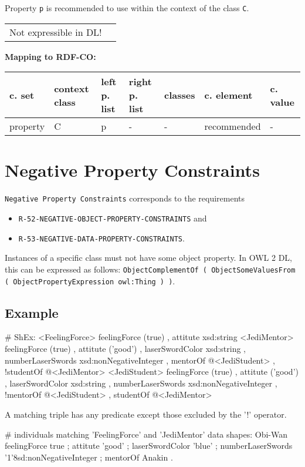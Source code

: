 \documentclass{llncs}
\newcommand{\ms}[1]{\texttt{#1}}
\newenvironment{gcotable}{
  \scriptsize
  \sffamily
  \vspace{0cm}
	\begin{center}
	\textbf{\vspace{0.4cm}Mapping to RDF-CO:} \\
  \begin{tabular}{l|l|l|l|l|l|l}
	\hline
  \textbf{c. set} & \textbf{context class} & \textbf{left p. list} & \textbf{right p. list} & \textbf{classes} & \textbf{c. element} & \textbf{c. value} \\
  \hline

}{
  \hline
  \end{tabular}
	\end{center}
}
\newenvironment{DL}{
\vspace{0cm}
	\begin{center}
  \begin{tabular}{r l}

}{
  \end{tabular}
	\end{center}
}
\begin{document}
Property \ms{p} is recommended to use within the context of the class \ms{C}.

\begin{DL}
Not expressible in DL!
\end{DL}

\begin{gcotable}
property & C & p & - & - & recommended & - \\
\end{gcotable}

\section{Negative Property Constraints}

\ms{Negative Property Constraints} corresponds to the requirements
\begin{itemize}
	\item \ms{R-52-NEGATIVE-OBJECT-PROPERTY-CONSTRAINTS} and
	\item \ms{R-53-NEGATIVE-DATA-PROPERTY-CONSTRAINTS}.
\end{itemize}
Instances of a specific class must not have some object property.
In OWL 2 DL, this can be expressed as follows: \ms{ObjectComplementOf ( ObjectSomeValuesFrom ( ObjectPropertyExpression owl:Thing ) )}.

\subsection{Example}

\begin{ex}
# ShEx:
<FeelingForce> {
    feelingForce (true) ,
    attitute xsd:string }
<JediMentor> {
    feelingForce (true) ,
    attitute ('good') ,
    laserSwordColor xsd:string ,
    numberLaserSwords xsd:nonNegativeInteger ,
    mentorOf @<JediStudent> ,
   !studentOf @<JediMentor> }
<JediStudent> {
    feelingForce (true) ,
    attitute ('good') ,
    laserSwordColor xsd:string ,
    numberLaserSwords xsd:nonNegativeInteger ,
   !mentorOf @<JediStudent> ,
    studentOf @<JediMentor> }
\end{ex}

A matching triple has any predicate except those excluded by the '!' operator.

\begin{ex}
# individuals matching 'FeelingForce' and 'JediMentor' data shapes:
Obi-Wan 
    feelingForce true ;
    attitute 'good' ;
    laserSwordColor 'blue' ;
    numberLaserSwords '1'^^xsd:nonNegativeInteger ;
    mentorOf Anakin .
\end{ex}
\end{document}
